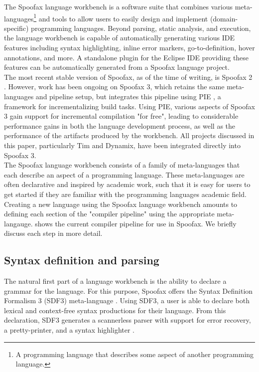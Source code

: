 
The Spoofax language workbench \cite{Spoofax2021} is a software suite that combines various meta-languages\footnote{A programming language that describes some aspect of another programming language.} and tools to allow users to easily design and implement (domain-specific) programming languages. Beyond parsing, static analysis, and execution, the language workbench is capable of automatically generating various IDE features including syntax highlighting, inline error markers, go-to-definition, hover annotations, and more. A standalone plugin for the Eclipse IDE providing these features can be automatically generated from a Spoofax language project.\\

The most recent stable version of Spoofax, as of the time of writing, is Spoofax 2 \cite{KatsV10}. However, work has been ongoing on Spoofax 3, which retains the same meta-languages and pipeline setup, but integrates this pipeline using PIE \cite{KonatSEV19}, a framework for incrementalizing build tasks. Using PIE, various aspects of Spoofax 3 gain support for incremental compilation "for free", leading to considerable performance gains in both the language development process, as well as the performance of the artifacts produced by the workbench. All projects discussed in this paper, particularly Tim and Dynamix, have been integrated directly into Spoofax 3.\\

The Spoofax language workbench consists of a family of meta-languages that each describe an aspect of a programming language. These meta-languages are often declarative and inspired by academic work, such that it is easy for users to get started if they are familiar with the programming languages academic field. Creating a new language using the Spoofax language workbench amounts to defining each section of the "compiler pipeline" using the appropriate meta-langauge.  shows the current compiler pipeline for use in Spoofax. We briefly discuss each step in more detail.

\subsection{Syntax definition and parsing}
\label{sec:spoofax_parsing_aterm}
The natural first part of a language workbench is the ability to declare a grammar for the language. For this purpose, Spoofax offers the Syntax Definition Formalism 3 (SDF3) meta-language \cite{Amorim2019}. Using SDF3, a user is able to declare both lexical and context-free syntax productions for their language. From this declaration, SDF3 generates a scannerless parser with support for error recovery, a pretty-printer, and a syntax highlighter \cite{AmorimV20}.\\


